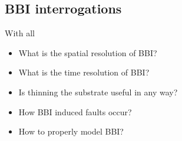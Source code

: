 	\subsection{BBI interrogations}
		With all
		\begin{itemize}
			\item What is the spatial resolution of BBI?
			\item What is the time resolution of BBI?
			\item Is thinning the substrate useful in any way?
			\item How BBI induced faults occur?
			\item How to properly model BBI?
		\end{itemize}
